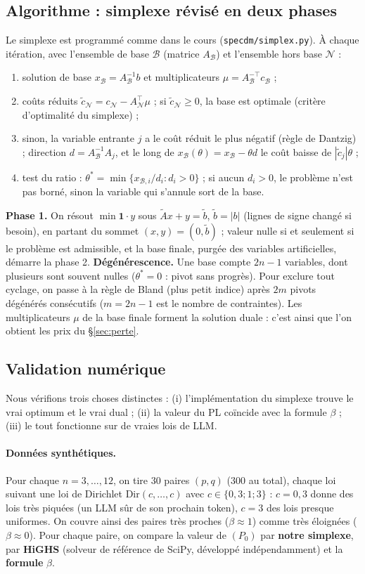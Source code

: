 \documentclass[11pt,a4paper]{article}
\newcommand{\cB}{\mathcal{B}}
\newcommand{\cN}{\mathcal{N}}
\theoremstyle{plain}
\theoremstyle{definition}
\begin{document}
\subsection{Algorithme : simplexe révisé en deux phases}\label{sec:simplexe}
Le simplexe est programmé comme dans le cours (\texttt{specdm/simplex.py}). À chaque itération, avec l'ensemble de base $\cB$ (matrice $A_\cB$) et l'ensemble hors base $\cN$ :
\begin{enumerate}
\item solution de base $x_\cB=A_\cB^{-1}b$ et multiplicateurs $\mu=A_\cB^{-\top}c_\cB$ ;
\item coûts réduits $\tilde c_\cN=c_\cN-A_\cN^\top\mu$ ; si $\tilde c_\cN\ge0$, la base est optimale (critère d'optimalité du simplexe) ;
\item sinon, la variable entrante $j$ a le coût réduit le plus négatif (règle de Dantzig) ; direction $d=A_\cB^{-1}A_j$, et le long de $x_\cB(\theta)=x_\cB-\theta d$ le coût baisse de $|\tilde c_j|\theta$ ;
\item test du ratio : $\theta^*=\min\{x_{\cB,i}/d_i:d_i>0\}$ ; si aucun $d_i>0$, le problème n'est pas borné, sinon la variable qui s'annule sort de la base.
\end{enumerate}
\textbf{Phase 1.} On résout $\min\mathbf1\cdot y$ sous $\tilde Ax+y=\tilde b$, $\tilde b=|b|$ (lignes de signe changé si besoin), en partant du sommet $(x,y)=(0,\tilde b)$ ; valeur nulle si et seulement si le problème est admissible, et la base finale, purgée des variables artificielles, démarre la phase 2.
\textbf{Dégénérescence.} Une base compte $2n-1$ variables, dont plusieurs sont souvent nulles ($\theta^*=0$ : pivot sans progrès). Pour exclure tout cyclage, on passe à la règle de Bland (plus petit indice) après $2m$ pivots dégénérés consécutifs ($m=2n-1$ est le nombre de contraintes).
Les multiplicateurs $\mu$ de la base finale forment la solution duale : c'est ainsi que l'on obtient les prix du §\ref{sec:perte}.

\subsection{Validation numérique}\label{sec:validation}
Nous vérifions trois choses distinctes : (i) l'implémentation du simplexe trouve le vrai optimum et le vrai dual ; (ii) la valeur du PL coïncide avec la formule $\beta$ ; (iii) le tout fonctionne sur de vraies lois de LLM.

\paragraph{Données synthétiques.} Pour chaque $n=3,\dots,12$, on tire 30 paires $(p,q)$ (300 au total), chaque loi suivant une loi de Dirichlet $\mathrm{Dir}(c,\dots,c)$ avec $c\in\{0{,}3;1;3\}$ : $c=0{,}3$ donne des lois très piquées (un LLM sûr de son prochain token), $c=3$ des lois presque uniformes. On couvre ainsi des paires très proches ($\beta\approx1$) comme très éloignées ($\beta\approx0$). Pour chaque paire, on compare la valeur de $(P_0)$ par \textbf{notre simplexe}, par \textbf{HiGHS} (solveur de référence de SciPy, développé indépendamment) et la \textbf{formule} $\beta$.
\end{document}
